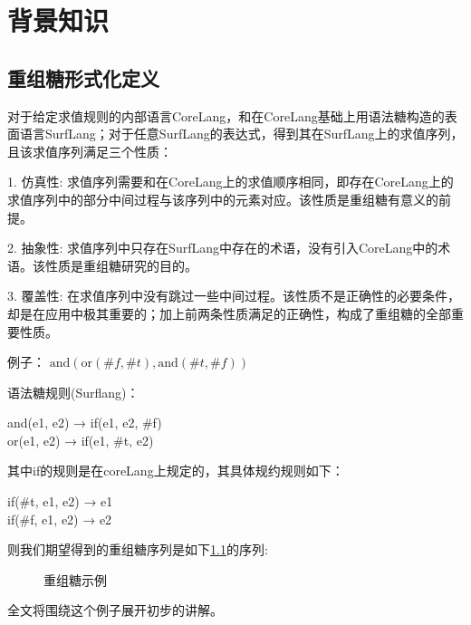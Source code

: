 \pagestyle{fancy}
\normalsize
\linespread{1.5}\selectfont
\label{mark:chapter2}\chapter{背景知识}

\section{重组糖形式化定义}
\label{mark:resugaring}对于给定求值规则的内部语言CoreLang，和在CoreLang基础上用语法糖构造的表面语言SurfLang；对于任意SurfLang的表达式，得到其在SurfLang上的求值序列，且该求值序列满足三个性质\label{mark:three}：

1.	仿真性: 求值序列需要和在CoreLang上的求值顺序相同，即存在CoreLang上的求值序列中的部分中间过程与该序列中的元素对应。该性质是重组糖有意义的前提。

2.	抽象性: 求值序列中只存在SurfLang中存在的术语，没有引入CoreLang中的术语。该性质是重组糖研究的目的。

3.	覆盖性: 在求值序列中没有跳过一些中间过程。该性质不是正确性的必要条件，却是在应用中极其重要的；加上前两条性质满足的正确性，构成了重组糖的全部重要性质。

例子：
$\mbox{and}(\mbox{or}(\#f, \#t), \mbox{and}(\#t, \#f))$

语法糖规则(Surflang)：
\begin{center}
	\parbox[t]{\textwidth}{%
		\begin{center}  
			and(e1, e2) → if(e1, e2, \#f)\\
			or(e1, e2) → if(e1, \#t, e2)
		\end{center}  
	}%
\end{center}



其中if的规则是在coreLang上规定的，其具体规约规则如下：
\begin{center}
	\parbox[t]{\textwidth}{%
		\begin{center}  
			if(\#t, e1, e2) → e1\\
			if(\#f, e1, e2) → e2
		\end{center}  
	}%
\end{center}
 

则我们期望得到的重组糖序列是如下\ref{fig:example}的序列:

\begin{figure}[ht]
	
\caption{重组糖示例}
\label{fig:example}
\end{figure}
全文将围绕这个例子展开初步的讲解。

